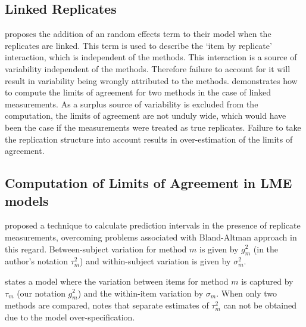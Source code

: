 \documentclass[12pt, a4paper]{report}
\theoremstyle{plain}
\theoremstyle{definition}
\theoremstyle{remark}
\begin{document}
	
\subsection*{Linked Replicates}
	
\citet{BXC2008} proposes the addition of an random effects term to their model when the replicates are linked. This term is used to describe the `item by replicate' interaction, which is independent of the methods. This interaction is a source of variability independent of the methods. Therefore failure to account for it will result in variability being wrongly attributed to the methods. \citet{BXC2008} demonstrates how to compute the limits of agreement for two methods in the case of linked measurements. As a surplus source of variability is excluded from the computation, the limits of agreement are not unduly wide, which would have been the case if the measurements were treated as true replicates.
Failure to take the replication structure into account results in over-estimation of the limits of agreement.
	
	
	
	
	
	\subsection*{Computation of Limits of Agreement in LME models}
	
	
	\citet{BXC2008} proposed a technique to calculate prediction intervals in the presence of replicate measurements, overcoming problems associated with Bland-Altman approach in this regard. Between-subject variation for method $m$ is given by $g^2_{m}$ (in the author's notation $\tau^2_m$) and within-subject variation is given by $\sigma^2_{m}$.  

	\citet{BXC2008} states a model where the variation between items for method $m$ is captured by $\tau_m$ (our notation $g^2_m$) and the within-item variation by $\sigma_m$. When only two methods are compared, \citet{BXC2008} notes that separate estimates of $\tau^2_m$ can not be obtained due to the model over-specification.
	
\end{document}
